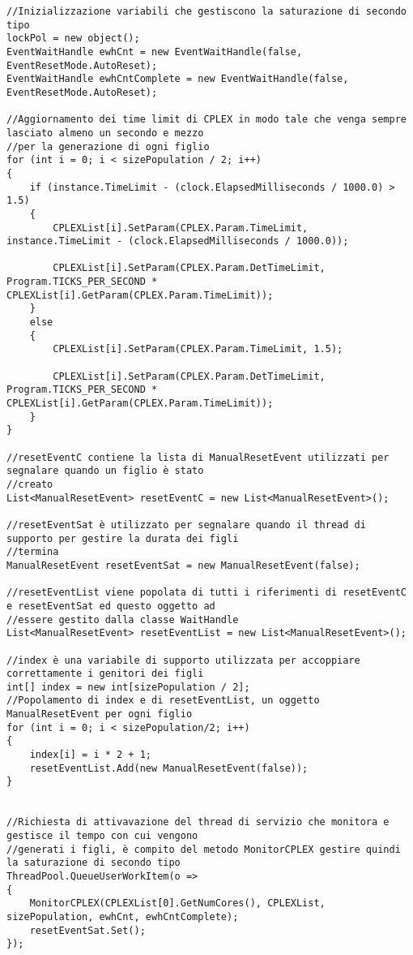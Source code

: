\documentclass[11pt]{article}
\begin{document}
\begin{lstlisting}
//Inizializzazione variabili che gestiscono la saturazione di secondo tipo
lockPol = new object();
EventWaitHandle ewhCnt = new EventWaitHandle(false, EventResetMode.AutoReset);
EventWaitHandle ewhCntComplete = new EventWaitHandle(false, EventResetMode.AutoReset);

//Aggiornamento dei time limit di CPLEX in modo tale che venga sempre lasciato almeno un secondo e mezzo
//per la generazione di ogni figlio
for (int i = 0; i < sizePopulation / 2; i++)
{
    if (instance.TimeLimit - (clock.ElapsedMilliseconds / 1000.0) > 1.5)
    {
        CPLEXList[i].SetParam(CPLEX.Param.TimeLimit, instance.TimeLimit - (clock.ElapsedMilliseconds / 1000.0));
        
        CPLEXList[i].SetParam(CPLEX.Param.DetTimeLimit, Program.TICKS_PER_SECOND * CPLEXList[i].GetParam(CPLEX.Param.TimeLimit));
    }
    else
    {
        CPLEXList[i].SetParam(CPLEX.Param.TimeLimit, 1.5);
        
        CPLEXList[i].SetParam(CPLEX.Param.DetTimeLimit, Program.TICKS_PER_SECOND * CPLEXList[i].GetParam(CPLEX.Param.TimeLimit));
    }
}

//resetEventC contiene la lista di ManualResetEvent utilizzati per segnalare quando un figlio è stato
//creato
List<ManualResetEvent> resetEventC = new List<ManualResetEvent>();

//resetEventSat è utilizzato per segnalare quando il thread di supporto per gestire la durata dei figli
//termina
ManualResetEvent resetEventSat = new ManualResetEvent(false);

//resetEventList viene popolata di tutti i riferimenti di resetEventC e resetEventSat ed questo oggetto ad
//essere gestito dalla classe WaitHandle
List<ManualResetEvent> resetEventList = new List<ManualResetEvent>();

//index è una variabile di supporto utilizzata per accoppiare correttamente i genitori dei figli
int[] index = new int[sizePopulation / 2];
//Popolamento di index e di resetEventList, un oggetto ManualResetEvent per ogni figlio
for (int i = 0; i < sizePopulation/2; i++)
{
    index[i] = i * 2 + 1;
    resetEventList.Add(new ManualResetEvent(false));
}


//Richiesta di attivavazione del thread di servizio che monitora e gestisce il tempo con cui vengono 
//generati i figli, è compito del metodo MonitorCPLEX gestire quindi la saturazione di secondo tipo
ThreadPool.QueueUserWorkItem(o =>
{
    MonitorCPLEX(CPLEXList[0].GetNumCores(), CPLEXList, sizePopulation, ewhCnt, ewhCntComplete);
    resetEventSat.Set();
});


\end{lstlisting}
\end{document}
